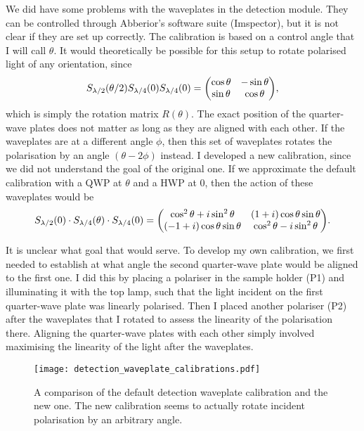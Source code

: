 We did have some problems with the waveplates in the detection module. They can be controlled through Abberior's software suite (Imspector), but it is not clear if they are set up correctly. The calibration is based on a control angle that I will call $ \theta $. It would theoretically be possible for this setup to rotate polarised light of any orientation, since
\begin{equation}
	S_\hwp(\theta/2) S_\qwp(0) S_\qwp(0) = \mqty(\cos\theta & -\sin\theta \\ \sin\theta & \cos\theta ),
\end{equation}
which is simply the rotation matrix $ R(\theta) $. The exact position of the quarter-wave plates does not matter as long as they are aligned with each other. If the waveplates are at a different angle $ \phi $, then this set of waveplates rotates the polarisation by an angle $ (\theta-2\phi) $ instead. I developed a new calibration, since we did not understand the goal of the original one. If we approximate the default calibration with a QWP at $ \theta $ and a HWP at 0, then the action of these waveplates would be
\begin{equation}
	S_\hwp(0)\cdot S_\qwp(\theta)\cdot S_\qwp(0) = 
		\mqty( \cos^2\theta + i\sin^2\theta & (1+i)\cos\theta\sin\theta \\
			   (-1+i)\cos\theta\sin\theta   & \cos^2\theta - i\sin^2\theta 
	    ).
\end{equation}

It is unclear what goal that would serve. To develop my own calibration, we first needed to establish at what angle the second quarter-wave plate would be aligned to the first one. I did this by placing a polariser in the sample holder (P1) and illuminating it with the top lamp, such that the light incident on the first quarter-wave plate was linearly polarised. Then I placed another polariser (P2) after the waveplates that I rotated to assess the linearity of the polarisation there. Aligning the quarter-wave plates with each other simply involved maximising the linearity of the light after the waveplates. 

\begin{figure}[h]
	\centering
	\texttt{[image: detection\_waveplate\_calibrations.pdf]}
	\caption{
		A comparison of the default detection waveplate calibration and the new one. The new calibration seems to actually rotate incident polarisation by an arbitrary angle.
	}
	\label{fig:detection waveplate calibrations}
\end{figure}


